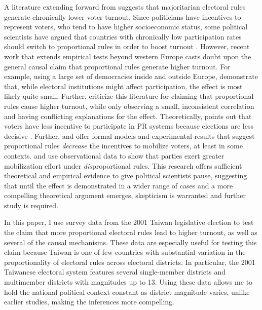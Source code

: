 \documentclass[12pt]{article}
\begin{document}
\doublespace
A literature extending forward from \cite{Powell1986} suggests that majoritarian electoral rules generate chronically lower voter turnout. Since politicians have incentives to represent voters, who tend to have higher socioeconomic status, some political scientists have argued that countries with chronically low participation rates should switch to proportional rules in order to boost turnout \citep{Lijphart1997, Lijphart1999}. However, recent work that extends empirical tests beyond western Europe casts doubt upon the general causal claim that proportional rules generate higher turnout. For example, using a large set of democracies inside and outside Europe, \cite{BlaisDobrzynska1998} demonstrate that, while electoral institutions might affect participation, the effect is most likely quite small. Further, \cite{BlaisAarts2006} criticize this literature for claiming that proportional rules cause higher turnout, while only observing a small, inconsistent correlation and having conflicting explanations for the effect. Theoretically, \cite{Jackman1987} points out that voters have less incentive to participate in PR systems because elections are less decisive \citep{Powell2000}. Further, \cite{SchramSonnemans1996} and \cite{HerreraMorelliPalfrey2013} offer formal models and experimental results that suggest proportional rules \textit{decrease} the incentives to mobilize voters, at least in some contexts. \cite{KarpBanducciBowler2007} and \cite{Rainey2011} use observational data to show that parties exert greater mobilization effort under \textit{dis}proportional rules. This research offers sufficient theoretical and empirical evidence to give political scientists pause, suggesting that until the effect is demonstrated in a wider range of cases and a more compelling theoretical argument emerges, skepticism is warranted and further study is required.

In this paper, I use survey data from the 2001 Taiwan legislative election to test the claim that more proportional electoral rules lead to higher turnout, as well as several of the causal mechanisms. These data are especially useful for testing this claim because Taiwan is one of few countries with substantial variation in the proportionality of electoral rules across electoral districts. In particular, the 2001 Taiwanese electoral system features several single-member districts and multimember districts with magnitudes up to 13. Using these data allows me to hold the national political context constant as district magnitude varies, unlike earlier studies, making the inferences more compelling.
\end{document}
